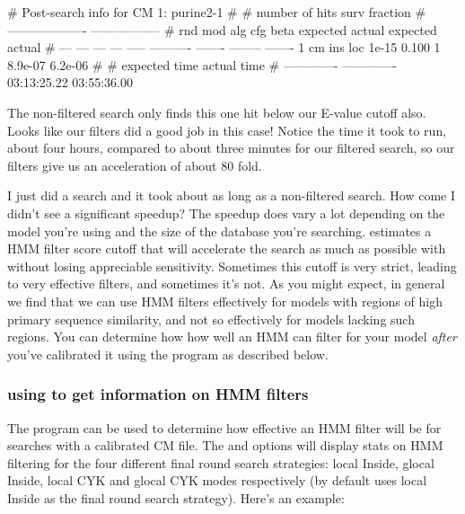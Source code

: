 
\begin{sreoutput}
# Post-search info for CM 1: purine2-1
#
#                              number of hits       surv fraction  
#                            -------------------  -----------------
# rnd  mod  alg  cfg   beta    expected   actual  expected   actual
# ---  ---  ---  ---  -----  ----------  -------  --------  -------
    1   cm  ins  loc  1e-15       0.100        1   8.9e-07  6.2e-06
#
# expected time    actual time
# -------------  -------------
    03:13:25.22    03:55:36.00
\end{sreoutput}

The non-filtered search only finds this one hit below our E-value
cutoff also. Looks like our filters did a good job in this case!
Notice the time it took to run, about four hours, compared to about three
minutes for our filtered search, so our filters give us an
acceleration of about 80 fold. 

\begin{srefaq}{I just did a search and it took about as long as a
    non-filtered search. How come I didn't see a significant speedup?}
  The speedup does vary a lot depending on the model you're using and
  the size of the database you're searching. 
  estimates a HMM filter score cutoff that will accelerate the search
  as much as possible with without losing appreciable
  sensitivity. Sometimes this cutoff is very strict, leading to very
  effective filters, and sometimes it's not. As you might expect, in
  general we find that we can use HMM filters effectively for models
  with regions of high primary sequence similarity, and not so
  effectively for models lacking such regions. You can determine how
  how well an HMM can filter for your model \emph{after} you've
  calibrated it using the  program as described below.
\end{srefaq}


\subsubsection{using  to get information on HMM filters}

The  program can be used to determine how effective an
HMM filter will be for searches with a calibrated CM file. The
 and  options will display stats on
HMM filtering for the four different final round search strategies:
local Inside, glocal Inside, local CYK and glocal CYK modes
respectively (by default  uses local Inside as the
final round search strategy). Here's an example:

